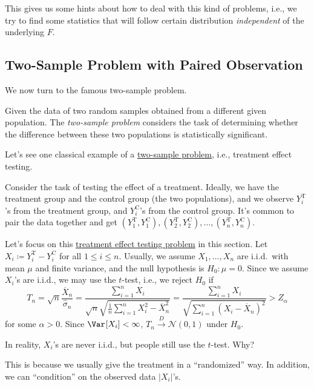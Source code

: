 This gives us some hints about how to deal with this kind of problems, i.e., we try to find some statistics that will follow certain distribution \emph{independent} of the underlying \(F\).

\subsection{Two-Sample Problem with Paired Observation}
We now turn to the famous two-sample problem.

\begin{problem}\label{prb:two-sample}
Given the data of two random samples obtained from a different given population. The \emph{two-sample problem} considers the task of determining whether the difference between these two populations is statistically significant.
\end{problem}

Let's see one classical example of a \hyperref[prb:two-sample]{two-sample problem}, i.e., treatment effect testing.

\begin{eg}\label{eg:treatment-effect}
	Consider the task of testing the effect of a treatment. Ideally, we have the treatment group and the control group (the two populations), and we observe \(Y_i^{\text{T} }\)'s from the treatment group, and \(Y_i^{\text{C} }\)'s from the control group. It's common to pair the data together and get \((Y_1^{\text{T} }, Y_1^{\text{C} }), (Y_2^{\text{T} }, Y_2^{\text{C} }), \dots , (Y_n^{\text{T} }, Y_n^{\text{C} })\).
\end{eg}

Let's focus on this \hyperref[eg:treatment-effect]{treatment effect testing problem} in this section. Let \(X_i \coloneqq Y_i^{\text{T} } - Y_i^{\text{C} }\) for all \(1 \leq i \leq n\). Usually, we assume \(X_1 , \dots , X_n\) are i.i.d.\ with mean \(\mu \) and finite variance, and the null hypothesis is \(H_0 \colon \mu = 0\). Since we assume \(X_i\)'s are i.i.d., we may use the \(t\)-test, i.e., we reject \(H_0\) if
\[
	T_n
	= \sqrt{n} \frac{\overline{X} _n}{\hat{\sigma} _n}
	= \frac{\sum_{i=1}^{n} X_i}{\sqrt{n} \sqrt{\frac{1}{n} \sum_{i=1}^{n} X_i^2 - \overline{X} _n^2} }
	= \frac{\sum_{i=1}^{n} X_i}{\sqrt{\sum_{i=1}^{n} (X_i - \overline{X} _n)^2} }
	> Z_{\alpha }
\]
for some \(\alpha > 0\). Since \(\Var_{}[X_i] < \infty \), \(T_n \overset{D}{\to} \mathcal{N} (0, 1)\) under \(H_0\).

\begin{problem*}
	In reality, \(X_i\)'s are never i.i.d., but people still use the \(t\)-test. Why?
\end{problem*}
\begin{answer}
	This is because we usually give the treatment in a ``randomized'' way. In addition, we can ``condition'' on the observed data \(\vert X_i \vert \)'s.
\end{answer}

